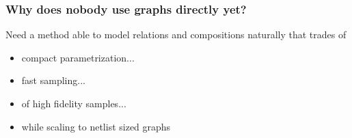 \documentclass[./presentation.tex]{subfiles}
\begin{document}
\begin{frame}[label=working]
  \frametitle{Why does nobody use graphs directly yet? 
  }
Need a method able to model relations and compositions naturally that trades of  %
\begin{itemize}
  \item<2-> compact parametrization...
  \item<3-> fast sampling...
  \item<4-> of high fidelity samples...
    \item<5-> while scaling to netlist sized graphs 
\end{itemize}
\end{frame}

  
\end{document}

